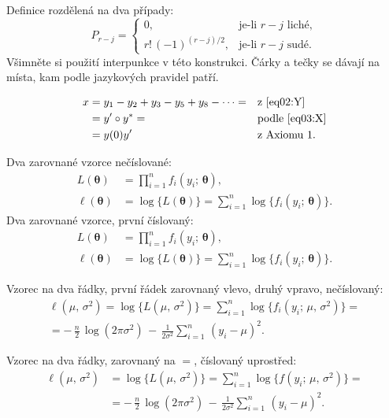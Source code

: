 Definice rozdělená na dva případy:
\[
P_{r-j}=
\begin{cases}
0, & \text{je-li $r-j$ liché},\\
r!\,(-1)^{(r-j)/2}, & \text{je-li $r-j$ sudé}.
\end{cases}
\]
Všimněte si použití interpunkce v této konstrukci. Čárky a tečky se
dávají na místa, kam podle jazykových pravidel patří.

\begin{align}
x& = y_1-y_2+y_3-y_5+y_8-\dots = && \text{z \eqref{eq02:Y}} \nonumber\\
& = y'\circ y^* = && \text{podle \eqref{eq03:X}} \nonumber\\
& = y(0) y' && \text {z Axiomu 1.}
\end{align}


Dva zarovnané vzorce nečíslované:
\begin{align*}
L(\bm\theta) &= \prod_{i=1}^n f_i(y_i;\,\bm\theta), \\
\ell(\bm\theta) &= \log\bigl\{L(\bm\theta)\bigr\} =
\sum_{i=1}^n \log\bigl\{f_i(y_i;\,\bm\theta)\bigr\}.
\end{align*}
Dva zarovnané vzorce, první číslovaný:
\begin{align}
L(\bm\theta) &= \prod_{i=1}^n f_i(y_i;\,\bm\theta), \label{eq01:L} \\
\ell(\bm\theta) &= \log\bigl\{L(\bm\theta)\bigr\} =
\sum_{i=1}^n \log\bigl\{f_i(y_i;\,\bm\theta)\bigr\}. \nonumber
\end{align}

Vzorec na dva řádky, první řádek zarovnaný vlevo, druhý vpravo, nečíslovaný:
\begin{multline*}
\ell(\mu,\,\sigma^2) = \log\bigl\{L(\mu,\,\sigma^2)\bigr\} =
\sum_{i=1}^n \log\bigl\{f_i(y_i;\,\mu,\,\sigma^2)\bigr\}= \\
  = -\,\frac{n}{2}\,\log(2\pi\sigma^2) \,-\,
\frac{1}{2\sigma^2}\sum_{i=1}^n\,(y_i - \mu)^2.
\end{multline*}

Vzorec na dva řádky, zarovnaný na $=$, číslovaný uprostřed:
\begin{equation}\label{eq01:ell}
\begin{split}
\ell(\mu,\,\sigma^2) &= \log\bigl\{L(\mu,\,\sigma^2)\bigr\} =
\sum_{i=1}^n \log\bigl\{f(y_i;\,\mu,\,\sigma^2)\bigr\}= \\
& = -\,\frac{n}{2}\,\log(2\pi\sigma^2) \,-\,
\frac{1}{2\sigma^2}\sum_{i=1}^n\,(y_i - \mu)^2.
\end{split}
\end{equation}

